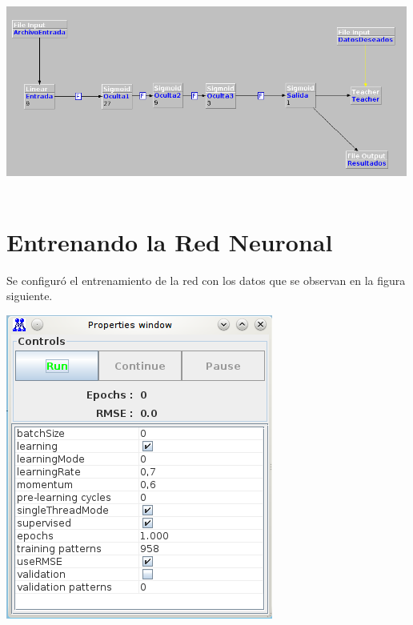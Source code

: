 \documentclass[12pt,titlepage]{article}
\begin{document}
\begin{center}
 \includegraphics[width=500,height=250]{./Images/RN.png}
\end{center}

\section{Entrenando la Red Neuronal}
Se configur\'o el entrenamiento de la red con los datos que se observan en la figura siguiente.

\begin{center}
 \includegraphics{./Images/configuracion-corridas.png}
\end{center}
\end{document}
